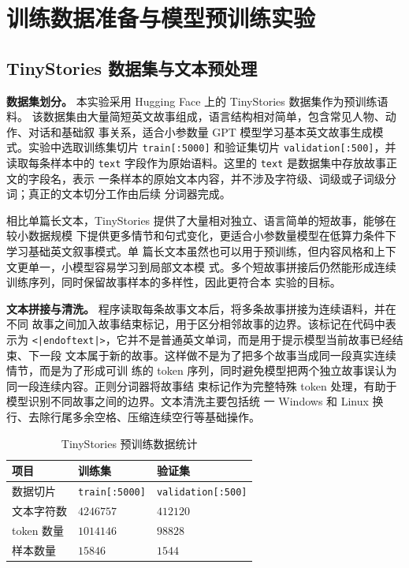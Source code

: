 \documentclass[UTF8,a4paper,zihao=-4,fontset=none]{ctexart}
\numberwithin{equation}{section}
\begin{document}
\section{训练数据准备与模型预训练实验}

\subsection{TinyStories 数据集与文本预处理}

\textbf{数据集划分。} 本实验采用 Hugging Face 上的 TinyStories 数据集作为预训练语料。
该数据集由大量简短英文故事组成，语言结构相对简单，包含常见人物、动作、对话和基础叙
事关系，适合小参数量 GPT 模型学习基本英文故事生成模式。实验中选取训练集切片
\texttt{train[:5000]} 和验证集切片 \texttt{validation[:500]}，并读取每条样本中的
\texttt{text} 字段作为原始语料。这里的 \texttt{text} 是数据集中存放故事正文的字段名，表示
一条样本的原始文本内容，并不涉及字符级、词级或子词级分词；真正的文本切分工作由后续
分词器完成。

相比单篇长文本，TinyStories 提供了大量相对独立、语言简单的短故事，能够在较小数据规模
下提供更多情节和句式变化，更适合小参数量模型在低算力条件下学习基础英文叙事模式。单
篇长文本虽然也可以用于预训练，但内容风格和上下文更单一，小模型容易学习到局部文本模
式。多个短故事拼接后仍然能形成连续训练序列，同时保留故事样本的多样性，因此更符合本
实验的目标。

\textbf{文本拼接与清洗。} 程序读取每条故事文本后，将多条故事拼接为连续语料，并在不同
故事之间加入故事结束标记，用于区分相邻故事的边界。该标记在代码中表示为
\texttt{<|endoftext|>}，它并不是普通英文单词，而是用于提示模型当前故事已经结束、下一段
文本属于新的故事。这样做不是为了把多个故事当成同一段真实连续情节，而是为了形成可训
练的 token 序列，同时避免模型把两个独立故事误认为同一段连续内容。正则分词器将故事结
束标记作为完整特殊 token 处理，有助于模型识别不同故事之间的边界。文本清洗主要包括统
一 Windows 和 Linux 换行、去除行尾多余空格、压缩连续空行等基础操作。

\begin{table}[!htbp]
  \centering
  \caption{TinyStories 预训练数据统计}
  \label{tab:pretrain_data_stats}
  \renewcommand{\arraystretch}{1.2}
  \begin{tabular}{lll}
    \toprule
    项目 & 训练集 & 验证集 \\
    \midrule
    数据切片 & \texttt{train[:5000]} & \texttt{validation[:500]} \\
    文本字符数 & $4246757$ & $412120$ \\
    token 数量 & $1014146$ & $98828$ \\
    样本数量 & $15846$ & $1544$ \\
    \bottomrule
  \end{tabular}
\end{table}
\end{document}
